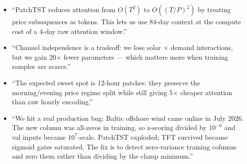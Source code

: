 \begin{itemize}
  \item ``PatchTST reduces attention from $O(T^2)$ to $O((T/P)^2)$
        by treating price subsequences as tokens. This lets us use
        84-day context at the compute cost of a 4-day raw attention window.''
  \item ``Channel independence is a tradeoff: we lose solar $\times$ demand
        interactions, but we gain 20$\times$ fewer parameters --- which
        matters more when training samples are scarce.''
  \item ``The expected sweet spot is 12-hour patches: they preserve the
        morning/evening price regime split while still giving 5$\times$
        cheaper attention than raw hourly encoding.''
  \item ``We hit a real production bug: Baltic offshore wind came online in
        July 2026. The new column was all-zeros in training, so z-scoring
        divided by $10^{-6}$ and val inputs became $10^7$-scale. PatchTST
        exploded; TFT survived because sigmoid gates saturated. The fix is
        to detect zero-variance training columns and zero them rather than
        dividing by the clamp minimum.''
\end{itemize}
